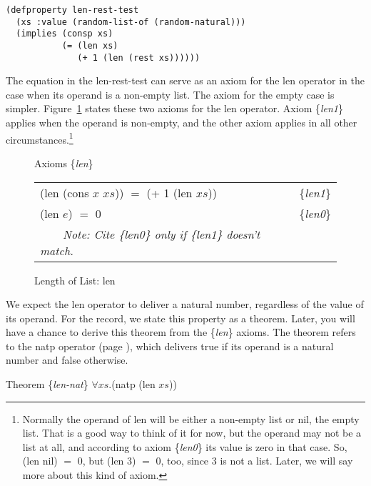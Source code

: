 \begin{Verbatim}
(defproperty len-rest-test
  (xs :value (random-list-of (random-natural)))
  (implies (consp xs)
           (= (len xs)
              (+ 1 (len (rest xs))))))
\end{Verbatim}

The equation in the len-rest-test can serve
as an axiom for the \textsf{len} operator in the case
when its operand is a non-empty list.
The axiom for the empty case is simpler.
Figure~\ref{fig:len-axioms} states these two axioms for
the len operator. Axiom \{\emph{len1}\} applies when
the operand is non-empty, and the other axiom
applies in all other circumstances.\footnote{Normally
the operand of len will be either a non-empty list or nil, the empty list.
That is a good way to think of it for now,
but the operand may not be a list at all,
and according to axiom \{\emph{len0}\} its value is zero in that case.
So, \textsf{(len nil)} $=$ $0$, but \textsf{(len $3$)} $=$ $0$, too, since
$3$ is not a list. Later, we will say more about this kind of axiom.}

\begin{figure}
\begin{center}
Axioms \{\emph{len}\} \\
\begin{tabular}{ll}
\textsf{(len (cons $x$ $xs$))} $=$ \textsf{(+ 1 (len $xs$))} & \{\emph{len1}\} \\
\textsf{(len $e$)} $=$ 0                            & \{\emph{len0}\} \\
~~~~\emph{Note: Cite \{\emph{len0}\} only if \{\emph{len1}\} doesn't match.}&\\
\end{tabular}
\end{center}
\caption{Length of List: len}
\label{len-equations}\label{fig:len-axioms}
\end{figure}

We expect the \textsf{len} operator to deliver a natural number,
regardless of the value of its operand.
For the record, we state this property as a theorem.
Later, you will have a chance to derive
this theorem from the \{\emph{len}\} axioms.
The theorem refers to the \textsf{natp} operator
(page \pageref{natp-op}),
which delivers true if its operand is a natural number and false otherwise.
\begin{samepage}
\label{len-nat-thm}
\begin{center}
Theorem \{\emph{len-nat}\} $\forall xs.$\textsf{(natp (len $xs$))}
\end{center}
\end{samepage}

